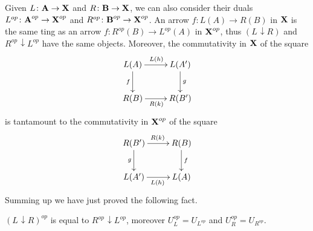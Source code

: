 \documentclass[runningheads,envcountsect]{llncs}
\def\B{\textbf {\textup{B}}}
\def\X{\textbf {\textup{X}}}
\def\A{\textbf {\textup{A}}}
\newcommand{\comma}[2]{#1\hspace{1pt} {\downarrow}#2}
\begin{document}
Given $L\colon \A\to \X$ and $R\colon \B\to \X$, we can also consider their duals $L^{op}\colon \A^{op}\to \X^{op}$ and $R^{op}\colon \B^{op}\to \X^{op}$.  An arrow $f\colon L(A)\to R(B)$ in $\X$ is the same ting as an arrow $f\colon R^{op}(B)\to L^{op}(A)$ in $\X^{op}$, thus $\left(\comma{L}{R}\right)$ and $\comma{R^{op}}{L^{op}}$ have the same objects. Moreover, the commutativity in  $\X$ of the square
\[\xymatrix@C=25pt{L(A) \ar[r]^{L(h)} \ar[d]_{f} & L(A') \ar[d]^{g}\\ R(B) \ar[r]_{R(k)}& R(B')}\]
is tantamount to the commutativity in $\X^{op}$ of the square 
\[\xymatrix@C=25pt{ R(B') \ar[d]_{g} \ar[r]^{R(k)}& R(B) \ar[d]^{f}\\ L(A') \ar[r]_{L(h)}  & L(A) }\]
Summing up we have just proved the following fact.
\begin{proposition}\label{prop:dual}
	$(\comma{L}{R})^{op}$ is equal to	$\comma{R^{op}}{L^{op}}$, moreover $U^{op}_L=U_{L^{op}}$ and $U^{op}_R=U_{R^{op}}$.
\end{proposition}
\end{document}
